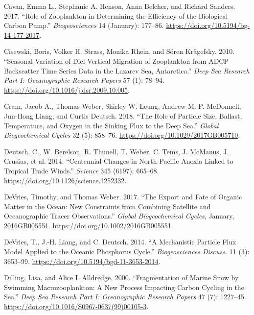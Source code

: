 \documentclass[]{article}
\begin{document}
\leavevmode\hypertarget{ref-cavanRoleZooplanktonDetermining2017}{}%
Cavan, Emma L., Stephanie A. Henson, Anna Belcher, and Richard Sanders.
2017. ``Role of Zooplankton in Determining the Efficiency of the
Biological Carbon Pump.'' \emph{Biogeosciences} 14 (January): 177--86.
\url{https://doi.org/10.5194/bg-14-177-2017}.

\leavevmode\hypertarget{ref-cisewskiSeasonalVariationDiel2010}{}%
Cisewski, Boris, Volker H. Strass, Monika Rhein, and Sören Krägefsky.
2010. ``Seasonal Variation of Diel Vertical Migration of Zooplankton
from ADCP Backscatter Time Series Data in the Lazarev Sea, Antarctica.''
\emph{Deep Sea Research Part I: Oceanographic Research Papers} 57 (1):
78--94. \url{https://doi.org/10.1016/j.dsr.2009.10.005}.

\leavevmode\hypertarget{ref-cramRoleParticleSize2018}{}%
Cram, Jacob A., Thomas Weber, Shirley W. Leung, Andrew M. P. McDonnell,
Jun-Hong Liang, and Curtis Deutsch. 2018. ``The Role of Particle Size,
Ballast, Temperature, and Oxygen in the Sinking Flux to the Deep Sea.''
\emph{Global Biogeochemical Cycles} 32 (5): 858--76.
\url{https://doi.org/10.1029/2017GB005710}.

\leavevmode\hypertarget{ref-deutschCentennialChangesNorth2014}{}%
Deutsch, C., W. Berelson, R. Thunell, T. Weber, C. Tems, J. McManus, J.
Crusius, et al. 2014. ``Centennial Changes in North Pacific Anoxia
Linked to Tropical Trade Winds.'' \emph{Science} 345 (6197): 665--68.
\url{https://doi.org/10.1126/science.1252332}.

\leavevmode\hypertarget{ref-devriesExportFateOrganic2017}{}%
DeVries, Timothy, and Thomas Weber. 2017. ``The Export and Fate of
Organic Matter in the Ocean: New Constraints from Combining Satellite
and Oceanographic Tracer Observations.'' \emph{Global Biogeochemical
Cycles}, January, 2016GB005551.
\url{https://doi.org/10.1002/2016GB005551}.

\leavevmode\hypertarget{ref-devriesMechanisticParticleFlux2014}{}%
DeVries, T., J.-H. Liang, and C. Deutsch. 2014. ``A Mechanistic Particle
Flux Model Applied to the Oceanic Phosphorus Cycle.''
\emph{Biogeosciences Discuss.} 11 (3): 3653--99.
\url{https://doi.org/10.5194/bgd-11-3653-2014}.

\leavevmode\hypertarget{ref-dillingFragmentationMarineSnow2000}{}%
Dilling, Lisa, and Alice L Alldredge. 2000. ``Fragmentation of Marine
Snow by Swimming Macrozooplankton: A New Process Impacting Carbon
Cycling in the Sea.'' \emph{Deep Sea Research Part I: Oceanographic
Research Papers} 47 (7): 1227--45.
\url{https://doi.org/10.1016/S0967-0637(99)00105-3}.
\end{document}
